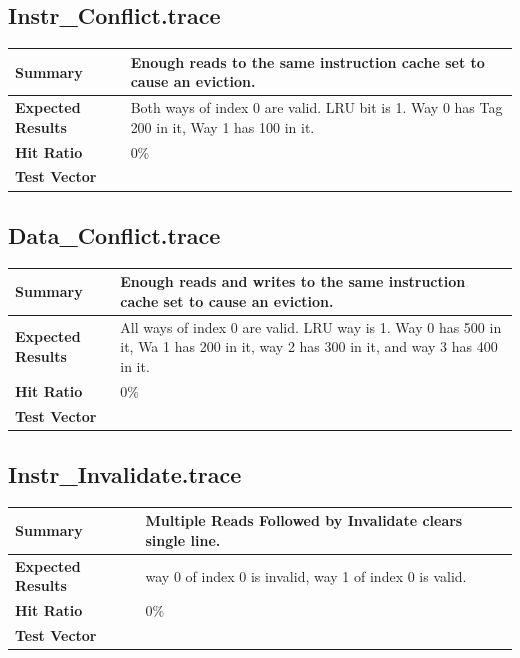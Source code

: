 \documentclass{article}
\begin{document}
\subsection{Instr\_Conflict.trace}
\begin{tabular}{|p{1.2in}|p{3.8in}|}
  \hline
  \textbf{Summary} & Enough reads to the same instruction cache set to cause an eviction. \\
  \hline
  \textbf{Expected Results} & Both ways of index 0 are valid. LRU bit is 1. Way 0
                  has Tag 200 in it, Way 1 has 100 in it.\\
  \hline
  \textbf{Hit Ratio} & 0\%\\
  \hline
  \textbf{Test Vector} &  \\
  \hline
\end{tabular}

\subsection{Data\_Conflict.trace}
\begin{tabular}{|p{1.2in}|p{3.8in}|}
  \hline
  \textbf{Summary} & Enough reads and writes to the same instruction cache set to
         cause an eviction.\\
  \hline
  \textbf{Expected Results} & All ways of index 0 are valid. LRU way is 1. Way 0
                  has 500 in it, Wa 1 has 200 in it, way 2 has 300 in
                  it, and way 3 has 400 in it.\\
  \hline
  \textbf{Hit Ratio} & 0\%\\
  \hline
  \textbf{Test Vector} &  \\
  \hline
\end{tabular}

\subsection{Instr\_Invalidate.trace}
\begin{tabular}{|p{1.2in}|p{3.8in}|}
  \hline
  \textbf{Summary} & Multiple Reads Followed by Invalidate clears single line. \\
  \hline
  \textbf{Expected Results} & way 0 of index 0 is invalid, way 1 of index 0 is
                  valid.\\
  \hline
  \textbf{Hit Ratio} & 0\%\\
  \hline
  \textbf{Test Vector} &  \\
  \hline
\end{tabular}
\end{document}
